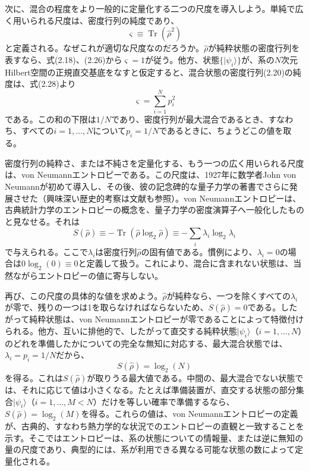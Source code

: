 次に、混合の程度をより一般的に定量化する二つの尺度を導入しよう。単純で広く用いられる尺度は、密度行列の純度であり、
\begin{equation}\varsigma\equiv\operatorname{Tr}(\hat\rho^2)\tag{2.30}\end{equation}
と定義される。なぜこれが適切な尺度なのだろうか。$\hat\rho$が純粋状態の密度行列を表すなら、式(2.18)、(2.26)から$\varsigma=1$が従う。他方、状態$\{\lvert\psi_i\rangle\}$が、系の$N$次元Hilbert空間の正規直交基底をなすと仮定すると、混合状態の密度行列(2.20)の純度は、式(2.28)より
\hypertarget{srcpage:41}{}\label{srcpage:41}
\begin{equation}\varsigma=\sum_{i=1}^N p_i^2\tag{2.31}\end{equation}
である。この和の下限は$1/N$であり、密度行列が最大混合であるとき、すなわち、すべての$i=1,\ldots,N$について$p_i=1/N$であるときに、ちょうどこの値を取る。

密度行列の純粋さ、または不純さを定量化する、もう一つの広く用いられる尺度は、von Neumannエントロピーである。この尺度は、1927年に数学者John von Neumannが初めて導入し\cite{ref059}、その後、彼の記念碑的な量子力学の著書\cite{ref060}でさらに発展させた（興味深い歴史的考察は文献\cite{ref061}も参照）。von Neumannエントロピーは、古典統計力学のエントロピーの概念を、量子力学の密度演算子へ一般化したものと見なせる。それは
\begin{equation}S(\hat\rho)\equiv-\operatorname{Tr}(\hat\rho\log_2\hat\rho)\equiv-\sum_i\lambda_i\log_2\lambda_i\tag{2.32}\end{equation}
で与えられる。ここで$\lambda_i$は密度行列$\hat\rho$の固有値である。慣例により、$\lambda_i=0$の場合は$0\log_2(0)\equiv0$と定義して扱う。これにより、混合に含まれない状態は、当然ながらエントロピーの値に寄与しない。

再び、この尺度の具体的な値を求めよう。$\hat\rho$が純粋なら、一つを除くすべての$\lambda_i$が零で、残りの一つは1を取らなければならないため、$S(\hat\rho)=0$である。したがって純粋状態は、von Neumannエントロピーが零であることによって特徴付けられる。他方、互いに排他的で、したがって直交する純粋状態$\lvert\psi_i\rangle$（$i=1,\ldots,N$）のどれを準備したかについての完全な無知に対応する、最大混合状態では、$\lambda_i=p_i=1/N$だから、
\begin{equation}S(\hat\rho)=\log_2(N)\tag{2.33}\end{equation}
を得る。これは$S(\hat\rho)$が取りうる最大値である。中間の、最大混合でない状態では、それに応じて値は小さくなる。たとえば準備装置が、直交する状態の部分集合$\lvert\psi_i\rangle$（$i=1,\ldots,M<N$）だけを等しい確率で準備するなら、$S(\hat\rho)=\log_2(M)$を得る。これらの値は、von Neumannエントロピーの定義が、古典的、すなわち熱力学的な状況でのエントロピーの直観と一致することを示す。そこではエントロピーは、系の状態についての情報量、または逆に無知の量の尺度であり、典型的には、系が利用できる異なる可能な状態の数によって定量化される。

